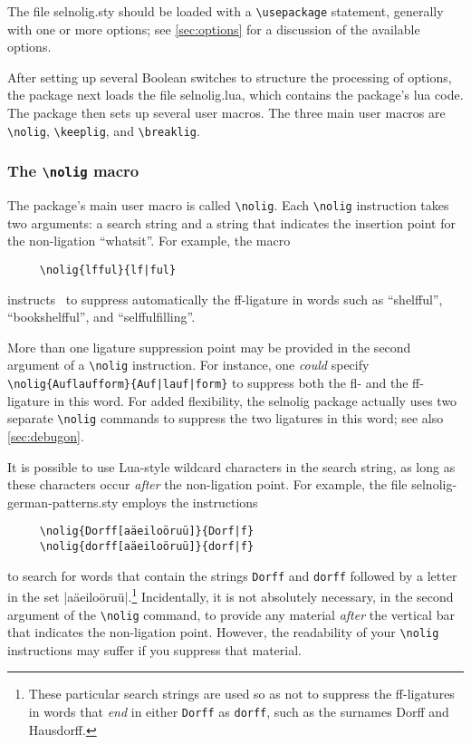 \documentclass[11pt]{article}
\newcommand{\pkg}[1]{\textsf{#1}}
\newcommand{\opt}[1]{\texttt{#1}}
\newcommand{\cmmd}[1]{\texttt{\textbackslash #1}}
\begin{document}
The file \pkg{selnolig.sty} should be loaded with a \cmmd{usepackage} statement, generally with one or more options; see \cref{sec:options} for a discussion of the available options. 

After setting up several Boolean switches to structure the processing of options, the package next loads the file \pkg{selnolig.lua}, which contains the package's lua code. The package then sets up several user macros. The three main user macros are \cmmd{nolig}, \cmmd{keeplig}, and \cmmd{breaklig}.



\subsubsection{The \cmmd{nolig} macro}
\label{sec:nolig}

\enlargethispage{0.3\baselineskip}

The package's main user macro is called \cmmd{nolig}. Each \cmmd{nolig} instruction takes two arguments: a search string and a string that indicates the insertion point for the non-ligation \enquote{whatsit}. For example, the macro
\begin{Verbatim}
     \nolig{lfful}{lf|ful}
\end{Verbatim}
instructs \LuaLaTeX\ to suppress automatically the ff-ligature in words such as \enquote{shelfful}, \enquote{bookshelfful}, and \enquote{selffulfilling}. 

More than one ligature suppression point may be provided in the second argument of a \cmmd{nolig} instruction. For instance, one \emph{could} specify \Verb+\nolig{Auflaufform}{Auf|lauf|form}+ to suppress both the fl- and the ff-ligature in this word. For added flexibility, the \pkg{selnolig} package actually uses two separate \cmmd{nolig} commands to suppress the two ligatures in this word; see also \cref{sec:debugon}.


It is possible to use Lua-style wildcard characters in the search string, as long as these characters occur \emph{after} the non-ligation point. For example, the file \pkg{selnolig-german-patterns.sty} employs the instructions 
\begin{Verbatim}
     \nolig{Dorff[aäeiloöruü]}{Dorf|f}
     \nolig{dorff[aäeiloöruü]}{dorf|f}
\end{Verbatim}
to search for words that contain the strings \opt{Dorff} and \opt{dorff} followed by a letter in the set |aäeiloöruü|.\footnote{These particular search strings are used so as not to suppress the ff-ligatures in words that \emph{end} in either \opt{Dorff} as \opt{dorff}, such as the surnames Dorff and Hausdorff.} Incidentally, it is not absolutely necessary, in the second argument of the \cmmd{nolig} command, to provide any material \emph{after} the vertical bar that indicates the non-ligation point. However, the readability of your \cmmd{nolig} instructions may suffer if you suppress that material.
\end{document}

